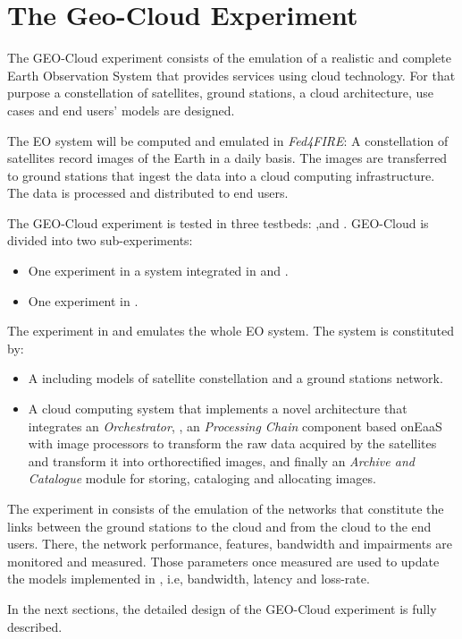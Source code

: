 
\chapter{The Geo-Cloud Experiment}
\label{chap:geocloud-experiment}
The GEO-Cloud experiment consists of the emulation of a realistic and complete Earth Observation System that provides services using cloud technology. For that purpose a constellation of satellites, ground stations, a cloud architecture, use cases and end users' models are designed.

The \ac{EO} system will be computed and emulated in \emph{Fed4FIRE}: A constellation of satellites record images of the Earth in a daily basis. The images are transferred to ground stations that ingest the data into a cloud computing infrastructure. The data is processed and distributed to end users.

The GEO-Cloud experiment is tested in three testbeds: \vw,\bonfire and
\pl. GEO-Cloud is divided into two sub-experiments:
\begin{itemize}
\item One experiment in a system integrated in \vw and \bonfire.
\item One experiment in \pl.
\end{itemize}

The experiment in \vw and \bonfire emulates the whole \ac{EO} system. The system is constituted by:

\begin{itemize}
\item A \sss including models of satellite constellation and a ground stations
  network.
\item A cloud computing system that implements a novel architecture that
  integrates an \emph{Orchestrator}, , an \emph{Processing Chain} component
  based on\ac{EaaS}  with image processors to transform the raw data acquired by the satellites and
  transform it into orthorectified images, and finally an \emph{Archive and Catalogue}
  module for storing, cataloging and allocating images.
\end{itemize}

The experiment in \pl consists of the emulation of the networks that constitute
the links between the ground stations to the cloud and from the cloud to the end
users. There, the network performance, features, bandwidth and impairments are
monitored and measured. Those parameters once measured are used to update the
models implemented in \vw, i.e, bandwidth, latency and loss-rate.

In the next sections, the detailed design of the GEO-Cloud experiment is fully described.
















